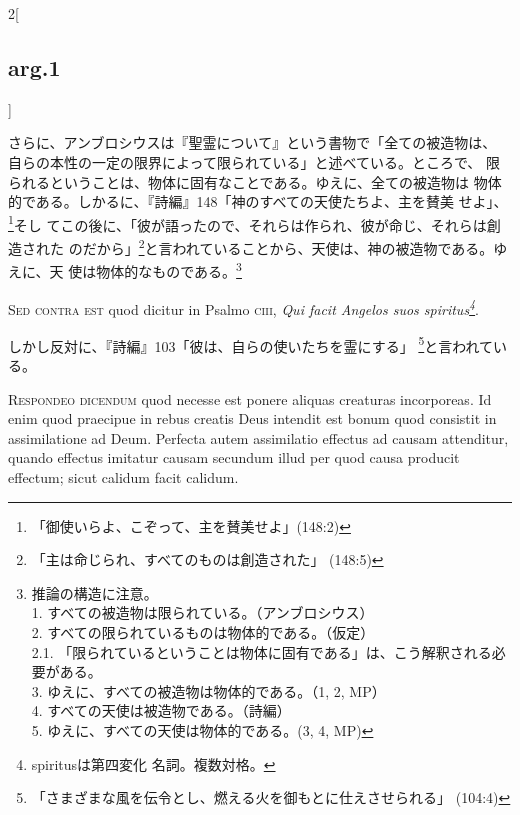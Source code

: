 \documentclass[paper=a4paper,fontsize=10pt,jafontsize=9pt,titlepage]{jlreq}
\begin{document}
\begin{paracol}{2}[\subsection{arg.1}]
\switchcolumn

さらに、アンブロシウスは『聖霊について』という書物で「全ての被造物は、
 自らの本性の一定の限界によって限られている」と述べている。ところで、
 限られるということは、物体に固有なことである。ゆえに、全ての被造物は
 物体的である。しかるに、『詩編』148「神のすべての天使たちよ、主を賛美
 せよ」、\footnote{「御使いらよ、こぞって、主を賛美せよ」(148:2)}そし
 てこの後に、「彼が語ったので、それらは作られ、彼が命じ、それらは創造された
 のだから」\footnote{「主は命じられ、すべてのものは創造された」
 (148:5)}と言われていることから、天使は、神の被造物である。ゆえに、天
 使は物体的なものである。\footnote{
推論の構造に注意。\\
1. すべての被造物は限られている。（アンブロシウス）\\
2. すべての限られているものは物体的である。（仮定）\\
2.1. 「限られているということは物体に固有である」は、こう解釈される必要がある。 \\
3. ゆえに、すべての被造物は物体的である。（1, 2, MP）\\
4. すべての天使は被造物である。（詩編）\\
5. ゆえに、すべての天使は物体的である。(3, 4, MP)
}

\switchcolumn*[\subsection{s.c.}]

{\scshape Sed contra est} quod dicitur in Psalmo {\scshape ciii},
{\itshape Qui facit Angelos suos spiritus\footnote{spiritusは第四変化
名詞。複数対格。}}.

\switchcolumn

しかし反対に、『詩編』103「彼は、自らの使いたちを霊にする」
 \footnote{「さまざまな風を伝令とし、燃える火を御もとに仕えさせられる」
 (104:4)}と言われている。


{\scshape Respondeo dicendum} quod necesse est ponere aliquas
creaturas incorporeas. Id enim quod praecipue in rebus creatis Deus
intendit est bonum quod consistit in assimilatione ad Deum. Perfecta
autem assimilatio effectus ad causam attenditur, quando effectus
imitatur causam secundum illud per quod causa producit effectum; sicut
calidum facit calidum.


\end{paracol}
\end{document}
